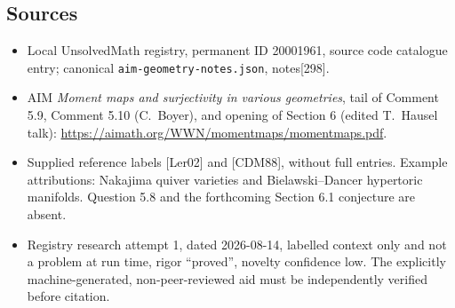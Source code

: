 \documentclass[11pt]{article}
\begin{document}
\subsection{Sources}
\begin{itemize}
\item Local UnsolvedMath registry, permanent ID 20001961, source code catalogue entry; canonical \texttt{aim-geometry-notes.json}, notes[298].
\item AIM \emph{Moment maps and surjectivity in various geometries}, tail of Comment 5.9, Comment 5.10 (C.~Boyer), and opening of Section 6 (edited T.~Hausel talk): \url{https://aimath.org/WWN/momentmaps/momentmaps.pdf}.
\item Supplied reference labels [Ler02] and [CDM88], without full entries. Example attributions: Nakajima quiver varieties and Bielawski--Dancer hypertoric manifolds. Question 5.8 and the forthcoming Section 6.1 conjecture are absent.
\item Registry research attempt 1, dated 2026-08-14, labelled context only and not a problem at run time, rigor ``proved'', novelty confidence low. The explicitly machine-generated, non-peer-reviewed aid must be independently verified before citation.
\end{itemize}
\end{document}
